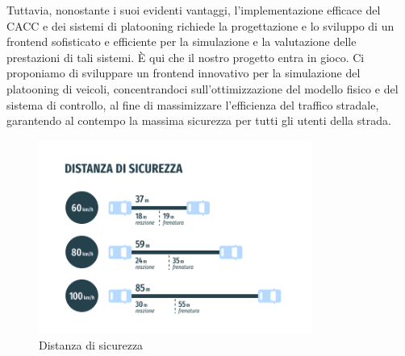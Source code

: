 \noindent Tuttavia, nonostante i suoi evidenti vantaggi, l'implementazione efficace del CACC e dei sistemi di platooning richiede la progettazione e lo sviluppo di un frontend sofisticato e efficiente per la simulazione e la valutazione delle prestazioni di tali sistemi. È qui che il nostro progetto entra in gioco. Ci proponiamo di sviluppare un frontend innovativo per la simulazione del platooning di veicoli, concentrandoci sull'ottimizzazione del modello fisico e del sistema di controllo, al fine di massimizzare l'efficienza del traffico stradale, garantendo al contempo la massima sicurezza per tutti gli utenti della strada.

\begin{figure}[H]
    \centering
    \captionsetup{justification=centering, margin=2cm}
    \includegraphics[width=0.8\textwidth]{images/1-introduction/distanza-sicurezza.png}
    \caption{Distanza di sicurezza \cite{distanza_sicurezza_autoscuola_quattroruote}}
    \label{fig:distanza-sicurezza}
\end{figure}
